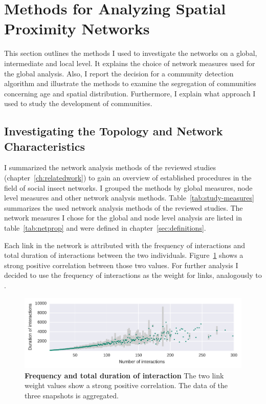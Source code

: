 \section{Methods for Analyzing Spatial Proximity Networks}
This section outlines the methods I used to investigate the networks on a global, intermediate and local level.
It explains the choice of network measures used for the global analysis.
Also, I report the decision for a community detection algorithm and illustrate the methods to examine the segregation of communities concerning age and spatial distribution.
Furthermore, I explain what approach I used to study the development of communities.

\subsection{Investigating the Topology and Network Characteristics}
\label{subsec:APmeasures}
I summarized the network analysis methods of the reviewed studies (chapter~\ref{ch:relatedwork}) to gain an overview of established procedures in the field of social insect networks. I grouped the methods by global measures, node level measures and other network analysis methods.
Table~\ref{tab:study-measures} summarizes the used network analysis methods of the reviewed studies.
The network measures I chose for the global and node level analysis are listed in table~\ref{tab:netprop} and were defined in chapter~\ref{sec:definitions}.

Each link in the network is attributed with the frequency of interactions and total duration of interactions between the two individuals.
Figure~\ref{fig:fVSd} shows a strong positive correlation between those two values. For further analysis I decided to use the frequency of interactions as the weight for links, analogously to \cite{mersch2013tracking,baracchi2014socio}.


\begin{figure}[htb]
	\centering
	\includegraphics[width=1.0\textwidth]{Figures/n3-freqVSduration}
	\caption[Frequency and total duration of interaction]{\textbf{Frequency and total duration of interaction} The two link weight values show a strong positive correlation. The data of the three snapshots is aggregated.}
	\label{fig:fVSd}
\end{figure}

